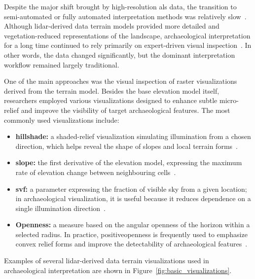 Despite the major shift brought by high-resolution \gls{als} data, the transition to semi-automated or fully automated interpretation methods was relatively slow~\cite{trier_using_2019,cowley_what_2016,verschoof-van_der_vaart_combining_2020}. Although \gls{lidar}-derived data terrain models provided more detailed and vegetation-reduced representations of the landscape, archaeological interpretation for a long time continued to rely primarily on expert-driven visual inspection~\cite{guyot_objective_2021,kokalj_standardizing_2025}. In other words, the data changed significantly, but the dominant interpretation workflow remained largely traditional.

One of the main approaches was the visual inspection of raster visualizations derived from the terrain model. Besides the base elevation model itself, researchers employed various visualizations designed to enhance subtle micro-relief and improve the visibility of target archaeological features. The most commonly used visualizations include:
\begin{itemize}
    \item \textbf{\gls{hillshade}:} a shaded-relief visualization simulating illumination from a chosen direction, which helps reveal the shape of \glspl{slope} and local terrain forms~\cite{kokalj_standardizing_2025,horn_hill_1981,hobbs_investigation_1999}.

    \item \textbf{\gls{slope}:} the first derivative of the elevation model, expressing the maximum rate of elevation change between neighbouring cells~\cite{kokalj_standardizing_2025,bundzel_semantic_2020}.

    \item \textbf{\gls{svf}:} a parameter expressing the fraction of visible sky from a given location; in archaeological visualization, it is useful because it reduces dependence on a single illumination direction~\cite{zaksek_sky-view_2011,kokalj_standardizing_2025}.

    \item \textbf{Openness:} a measure based on the angular openness of the horizon within a selected radius. In practice, \gls{positiveopenness} is frequently used to emphasize convex relief forms and improve the detectability of archaeological features~\cite{yokoyama_visualizing_2002,doneus_openness_2013,kokalj_standardizing_2025}.
\end{itemize}

Examples of several \gls{lidar}-derived data terrain visualizations used in archaeological interpretation are shown in Figure~\ref{fig:basic_visualizations}.

